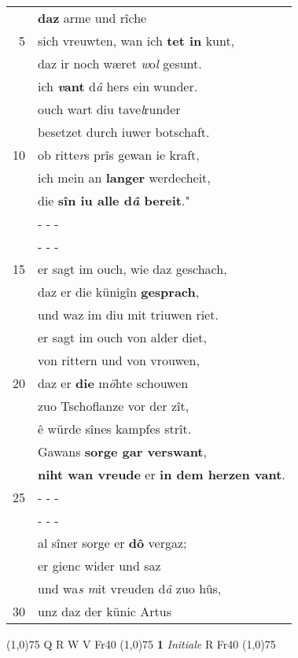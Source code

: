 \documentclass[8pt,a4paper,notitlepage]{article}
\begin{document}
\begin{table}[ht]
\begin{minipage}[t]{0.5\linewidth}
\begin{tabular}{rl}
 & \textbf{daz} arme und rîche\\ 
5 & sich vreuwten, wan ich \textbf{tet in} kunt,\\ 
 & daz ir noch wæret \textit{w}o\textit{l} gesunt.\\ 
 & ich \textbf{\textit{v}ant} d\textit{â} hers ein wunder.\\ 
 & ouch wart diu tave\textit{l}runder\\ 
 & besetzet durch iuwer botschaft.\\ 
10 & ob ritte\textit{r}s prîs gewan ie kraft,\\ 
 & ich mein an \textbf{langer} werdecheit,\\ 
 & die \textbf{sîn iu alle d\textit{â} bereit}."\\ 
 & \multicolumn{1}{l}{ - - - }\\ 
 & \multicolumn{1}{l}{ - - - }\\ 
15 & er sagt im ouch, wie daz geschach,\\ 
 & daz er die künigîn \textbf{gesprach},\\ 
 & und waz im diu mit triuwen riet.\\ 
 & er sagt im ouch von alder diet,\\ 
 & von rittern und von vrouwen,\\ 
20 & daz er \textbf{die} m\textit{ö}hte schouwen\\ 
 & zuo Tschoflanze vor der zît,\\ 
 & ê würde sînes kampfes strît.\\ 
 & Gawans \textbf{sorge gar verswant},\\ 
 & \textbf{niht wan vreude} er \textbf{in dem herzen vant}.\\ 
25 & \multicolumn{1}{l}{ - - - }\\ 
 & \multicolumn{1}{l}{ - - - }\\ 
 & al sîner sorge er \textbf{dô} vergaz;\\ 
 & er gienc wider und saz\\ 
 & und wa\textit{s m}it vreuden d\textit{â} zuo hûs,\\ 
30 & unz daz der künic Artus\\ 
\end{tabular}
\scriptsize
\line(1,0){75} \newline
Q R W V Fr40 \newline
\line(1,0){75} \newline
\textbf{1} \textit{Initiale} R Fr40  \newline
\line(1,0){75} \newline

\end{minipage}
\end{table}
\end{document}
